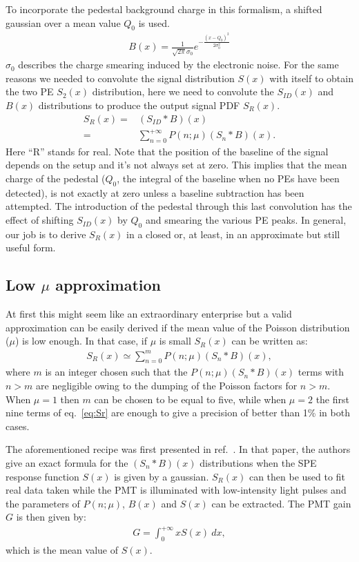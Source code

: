\documentclass[a4paper,11pt]{article}
\begin{document}
To incorporate the pedestal background charge in this formalism, a shifted gaussian over a mean value $Q_0$ is used. 
\begin{align}
B(x) = \frac{1}{\sqrt{2\pi}\sigma_0} e^{ - \frac{( x - Q_0 )^2}{2\sigma_0^2}}
\end{align}
$\sigma_0$ describes the charge smearing induced by the electronic noise.
For the same reasons we needed to convolute the signal distribution $S(x)$ with itself to obtain the two PE $S_2(x)$ distribution, 
here we need to convolute the $S_{ID}(x)$ and $B(x)$ distributions to produce the output signal PDF $S_{R}(x)$. 
\begin{align}
S_R(x) = &     (S_{ID}*B)(x) \nonumber  \\
            = & \sum_{n=0}^{+\infty} P( n; \mu ) ( S_n * B )(x). 
\label{eq:Sr0}
\end{align}
Here ``R'' stands for real. 
Note that the position of the baseline of the signal depends on the setup and it's not always set at zero.  This implies that the mean charge of the pedestal
($Q_0$, the integral of the baseline when no PEs have been detected), is not exactly at zero unless a baseline subtraction has been attempted. 
The introduction of the pedestal through this last convolution has the effect of shifting $S_{ID}(x)$ by $Q_0$ and smearing the various PE peaks. 
In general, our job is to derive $S_R(x)$ in a closed or, at least, in an approximate but still useful form.


\subsection{Low $\mu$ approximation}
%

At first this might seem like an extraordinary enterprise but a valid approximation can be easily derived if the mean value of the Poisson distribution ($\mu$) is low enough. 
In that case, if $\mu$ is small $S_R(x)$ can be written as: 
\begin{align}
S_{R}(x) \simeq \sum_{n=0}^{m} P( n; \mu ) (S_n*B)(x), 
\label{eq:Sr}
\end{align}
where $m$ is an integer chosen such that the $ P( n; \mu ) (S_n*B)(x)$ terms with $n > m $ are negligible owing to the dumping of the Poisson factors for $n > m $. 
When $\mu= 1$ then $m$ can be chosen to be equal to five, while when $\mu= 2$ the first nine terms of eq.~\eqref{eq:Sr} are enough to give a precision of better than 1\% in both cases.

The aforementioned recipe was first presented in ref.~\cite{Bellamy}.  
In that paper, the authors give an exact formula for the $(S_n*B)(x)$ distributions when the SPE response function $S(x)$ is given by a gaussian. 
$S_R(x)$ can then be used to fit real data taken while the PMT is illuminated with low-intensity light pulses and the parameters of $P(n;\mu)$, $B(x)$ and $S(x)$ can be extracted. 
The PMT gain $G$ is then given by: 
\begin{align}
G =  \int_{0}^{+\infty} x S(x) \ dx,
\end{align}
which is the mean value of $S(x)$.
\end{document}
